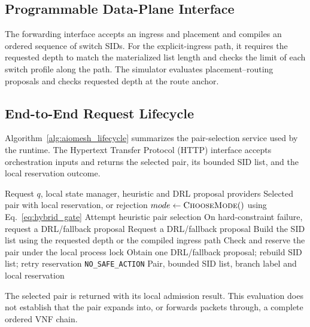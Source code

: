 \documentclass[final,5p]{elsarticle}
\newcommand{\rev}[1]{\textcolor{revisiongreen}{#1}}
\let\newrev\rev
\begin{document}
\subsection{Programmable Data-Plane Interface}
\label{subsec:data_plane_interface}

\newrev{The forwarding interface accepts an ingress and placement and compiles an ordered sequence of switch SIDs. For the explicit-ingress path, it requires the requested depth to match the materialized list length and checks the limit of each switch profile along the path. The simulator evaluates placement--routing proposals and checks requested depth at the route anchor.}

\subsection{End-to-End Request Lifecycle}
\label{subsec:request_lifecycle}
\newrev{Algorithm~\ref{alg:aiomesh_lifecycle} summarizes the pair-selection service used by the runtime. The Hypertext Transfer Protocol (HTTP) interface accepts orchestration inputs and returns the selected pair, its bounded SID list, and the local reservation outcome.}

\begin{algorithm}[t]
\caption{Local pair-selection and reservation service}
\label{alg:aiomesh_lifecycle}
\small
\begin{algorithmic}[1]
\Require Request \(q\), local state manager, heuristic and DRL proposal providers
\Ensure Selected pair with local reservation, or rejection
\State \(mode\gets\textsc{ChooseMode}()\) using Eq.~\eqref{eq:hybrid_gate}
    \State Attempt heuristic pair selection
    \State On hard-constraint failure, request a DRL/fallback proposal
\Else
    \State Request a DRL/fallback proposal
\EndIf
\State \newrev{Build the SID list using the requested depth or the compiled ingress path}
\State Check and reserve the pair under the local process lock
    \State Obtain one DRL/fallback proposal; rebuild SID list; retry reservation
\EndIf
{}
    \State \Return \texttt{NO\_SAFE\_ACTION}
\EndIf
\State \Return Pair, bounded SID list, branch label and local reservation
\end{algorithmic}
\end{algorithm}

\newrev{The selected pair is returned with its local admission result. This evaluation does not establish that the pair expands into, or forwards packets through, a complete ordered VNF chain.}
\end{document}
